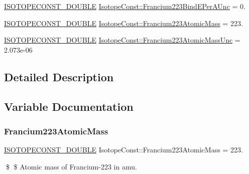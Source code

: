 \begin{DoxyCompactItemize}
\mbox{\hyperlink{group___isotope_const-_macros_ga8f45a7272ce02c0b4c65c44636ed719a}{I\+S\+O\+T\+O\+P\+E\+C\+O\+N\+S\+T\+\_\+\+D\+O\+U\+B\+LE}} \mbox{\hyperlink{group___isotope_const-_francium-_fr223_gae9bc88639ee9761d10665bec93f64def}{Isotope\+Const\+::\+Francium223\+Bind\+E\+Per\+A\+Unc}} = 0.
\item 
\mbox{\hyperlink{group___isotope_const-_macros_ga8f45a7272ce02c0b4c65c44636ed719a}{I\+S\+O\+T\+O\+P\+E\+C\+O\+N\+S\+T\+\_\+\+D\+O\+U\+B\+LE}} \mbox{\hyperlink{group___isotope_const-_francium-_fr223_gaad30d5d0c80719ba82bcae3451781561}{Isotope\+Const\+::\+Francium223\+Atomic\+Mass}} = 223.
\item 
\mbox{\hyperlink{group___isotope_const-_macros_ga8f45a7272ce02c0b4c65c44636ed719a}{I\+S\+O\+T\+O\+P\+E\+C\+O\+N\+S\+T\+\_\+\+D\+O\+U\+B\+LE}} \mbox{\hyperlink{group___isotope_const-_francium-_fr223_ga61d4dcd21dc99c7a3e9755b478887095}{Isotope\+Const\+::\+Francium223\+Atomic\+Mass\+Unc}} = 2.\+073e-\/06
\end{DoxyCompactItemize}


\subsection{Detailed Description}


\subsection{Variable Documentation}
\mbox{\label{group___isotope_const-_francium-_fr223_gaad30d5d0c80719ba82bcae3451781561}} 
\subsubsection{\texorpdfstring{Francium223\+Atomic\+Mass}{Francium223AtomicMass}}
{\footnotesize\ttfamily \mbox{\hyperlink{group___isotope_const-_macros_ga8f45a7272ce02c0b4c65c44636ed719a}{I\+S\+O\+T\+O\+P\+E\+C\+O\+N\+S\+T\+\_\+\+D\+O\+U\+B\+LE}} Isotope\+Const\+::\+Francium223\+Atomic\+Mass = 223.}

\$ \$ Atomic mass of Francium-\/223 in amu. \mbox{\label{group___isotope_const-_francium-_fr223_ga61d4dcd21dc99c7a3e9755b478887095}} 
